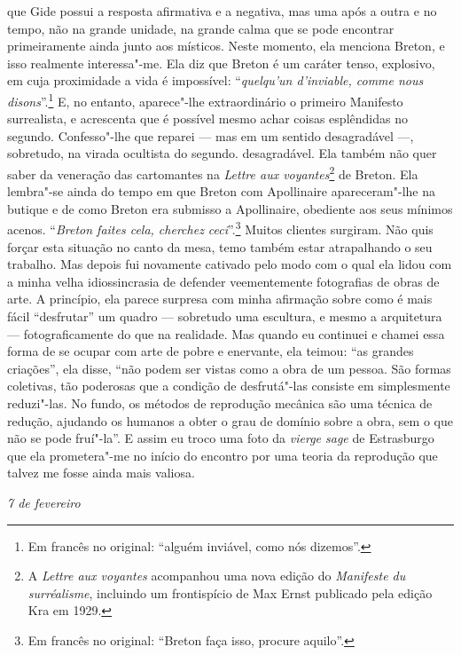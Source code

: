 que Gide possui a resposta afirmativa e a negativa, mas uma após a outra
e no tempo, não na grande unidade, na grande calma que se pode encontrar
primeiramente ainda junto aos místicos. Neste momento, ela menciona
Breton, e isso realmente interessa"-me. Ela diz que Breton é um caráter
tenso, explosivo, em cuja proximidade a vida é impossível:
``\emph{quelqu'un d'inviable, comme nous disons}''.\footnote{Em francês no original: ``alguém inviável, como nós dizemos''. \versal{[N.~T.]}} E, no entanto,
aparece"-lhe extraordinário o primeiro Manifesto surrealista, e acrescenta que é possível mesmo achar coisas esplêndidas no segundo. Confesso"-lhe que
reparei --- mas em um sentido desagradável ---, sobretudo, na virada ocultista do segundo.
desagradável. Ela também não quer saber da veneração das cartomantes na
\emph{Lettre aux voyantes}\footnote{A \emph{Lettre aux voyantes}
  acompanhou uma nova edição do \emph{Manifeste du surréalisme},
  incluindo um frontispício de Max Ernst publicado pela edição Kra em
  1929. \versal{[N.~O.]}} de Breton. Ela lembra"-se ainda do tempo em que Breton com
Apollinaire apareceram"-lhe na butique e de como Breton era submisso a
Apollinaire, obediente aos seus mínimos acenos. ``\emph{Breton faites
cela, cherchez ceci}''.\footnote{Em francês no original: ``Breton faça isso, procure
  aquilo''. \versal{[N.~T.]}} Muitos clientes surgiram. Não quis
forçar esta situação no canto da mesa, temo também estar atrapalhando
o seu trabalho. Mas depois fui novamente cativado pelo modo com o qual
ela lidou com a minha velha idiossincrasia de defender veementemente fotografias de obras de arte. A princípio, ela parece surpresa com minha
afirmação sobre como é mais fácil ``desfrutar'' um quadro --- sobretudo uma
escultura, e mesmo a arquitetura --- fotograficamente do que na
realidade. Mas quando eu continuei e chamei essa forma de se ocupar com
arte de pobre e enervante, ela teimou: ``as grandes criações'', ela disse,
``não podem ser vistas como a obra de um pessoa. São formas coletivas,
tão poderosas que a condição de desfrutá"-las consiste em simplesmente
reduzi"-las. No fundo, os métodos de reprodução mecânica são uma técnica
de redução, ajudando os humanos a obter o grau de domínio sobre a obra,
sem o que não se pode fruí"-la''. E assim eu troco uma foto da
\emph{vierge sage} de Estrasburgo que ela prometera"-me no início do
encontro por uma teoria da reprodução que talvez me fosse ainda mais
valiosa.


\begin{flushright}
\emph{7 de fevereiro}
\end{flushright}

